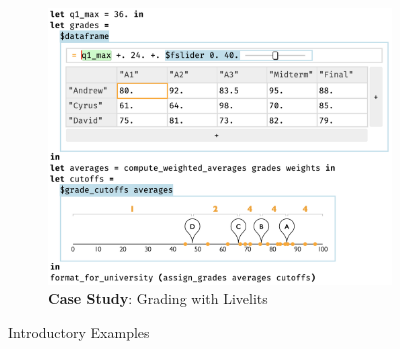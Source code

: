 \begin{figure}
\begin{minipage}[t]{0.38\textwidth}
\begin{subfigure}[t]{\linewidth}
    \end{subfigure}
  \end{minipage}
  \hspace{10.5mm}
  \begin{subfigure}[t]{0.55\textwidth}
  \begin{snugshade}
   \vspace*{-2mm}
    \caption{\textbf{Case Study}: Grading with Livelits}
    \label{fig:grading}
    \vspace*{1mm}
     \end{snugshade}
    \vspace*{-1mm}
    \includegraphics[width=\linewidth]{grade-cutoff-livelit.png}
  \end{subfigure}
  \vspace{-5mm}
   \caption{Introductory Examples}
\end{figure}

